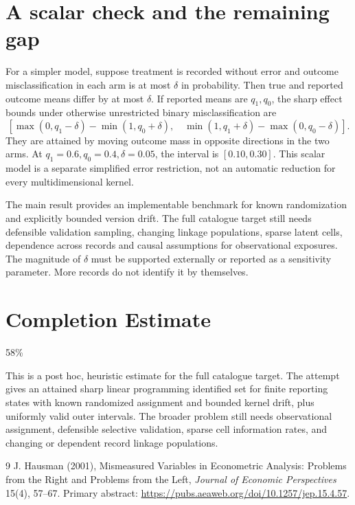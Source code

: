 \documentclass[11pt]{article}
\begin{document}
\section*{A scalar check and the remaining gap}
For a simpler model, suppose treatment is recorded without error and outcome misclassification in each arm is at most $\delta$ in probability. Then true and reported outcome means differ by at most $\delta$. If reported means are $q_1,q_0$, the sharp effect bounds under otherwise unrestricted binary misclassification are
\[
 [\max(0,q_1-\delta)-\min(1,q_0+\delta),\quad
   \min(1,q_1+\delta)-\max(0,q_0-\delta)].
\]
They are attained by moving outcome mass in opposite directions in the two arms. At $q_1=0.6,q_0=0.4,\delta=0.05$, the interval is $[0.10,0.30]$. This scalar model is a separate simplified error restriction, not an automatic reduction for every multidimensional kernel.

The main result provides an implementable benchmark for known randomization and explicitly bounded version drift. The full catalogue target still needs defensible validation sampling, changing linkage populations, sparse latent cells, dependence across records and causal assumptions for observational exposures. The magnitude of $\delta$ must be supported externally or reported as a sensitivity parameter. More records do not identify it by themselves.

\section{Completion Estimate}
58\%

This is a post hoc, heuristic estimate for the full catalogue target.
The attempt gives an attained sharp linear programming identified set for finite reporting states with known randomized assignment and bounded kernel drift, plus uniformly valid outer intervals. The broader problem still needs observational assignment, defensible selective validation, sparse cell information rates, and changing or dependent record linkage populations.

\begin{thebibliography}{9}
 J. Hausman (2001), Mismeasured Variables in Econometric Analysis: Problems from the Right and Problems from the Left, \emph{Journal of Economic Perspectives} 15(4), 57--67. Primary abstract:
\url{https://pubs.aeaweb.org/doi/10.1257/jep.15.4.57}.
\end{thebibliography}
\end{document}
